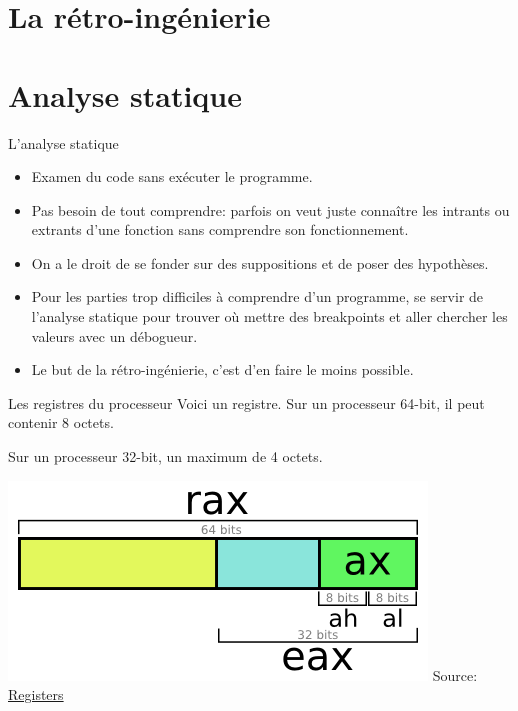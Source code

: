 \documentclass[10pt,xcolor={table,dvipsnames},t]{beamer}
\begin{document}
\section{La rétro-ingénierie}


\section{Analyse statique}

\begin{frame}{L'analyse statique}

\begin{itemize}
    \item Examen du code sans exécuter le programme.
    \item Pas besoin de tout comprendre: parfois on veut juste connaître les intrants ou extrants d'une fonction sans comprendre son fonctionnement.
    \item On a le droit de se fonder sur des suppositions et de poser des hypothèses.
    \item Pour les parties trop difficiles à comprendre d'un programme, se servir de l'analyse statique pour trouver où mettre des breakpoints et aller chercher les valeurs avec un débogueur. 
    \item Le but de la rétro-ingénierie, c'est d'en faire le moins possible.
\end{itemize}


\end{frame}



\begin{frame}{Les registres du processeur}
    Voici un registre. Sur un processeur 64-bit, il peut contenir 8 octets. 
    
    Sur un processeur 32-bit, un maximum de 4 octets. 
    
    \begin{center}
    \includegraphics[width=.60\textwidth,height=.40\textheight]{Register}\newline{}
    Source: \href{http://blog.jpauli.tech/2016-11-30-on-c-performances-html/}{Registers}
    \end{center}
\end{frame}
\end{document}
